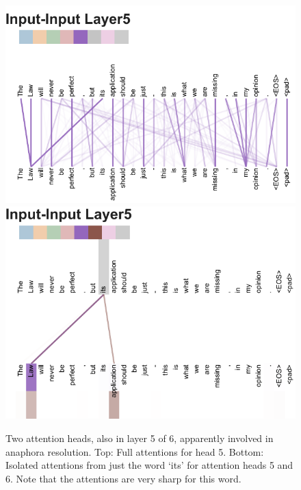 \documentclass{article}
\begin{document}
\begin{figure}
{\includegraphics[width=\textwidth, trim=0 0 0 45, clip]{./vis/anaphora_resolution_new.pdf}}
{\includegraphics[width=\textwidth, trim=0 0 0 37, clip]{./vis/anaphora_resolution2_new.pdf}}
\caption{Two attention heads, also in layer 5 of 6, apparently involved in anaphora resolution. Top: Full attentions for head 5. Bottom: Isolated attentions from just the word `its' for attention heads 5 and 6. Note that the attentions are very sharp for this word.}
\end{figure}
\end{document}
